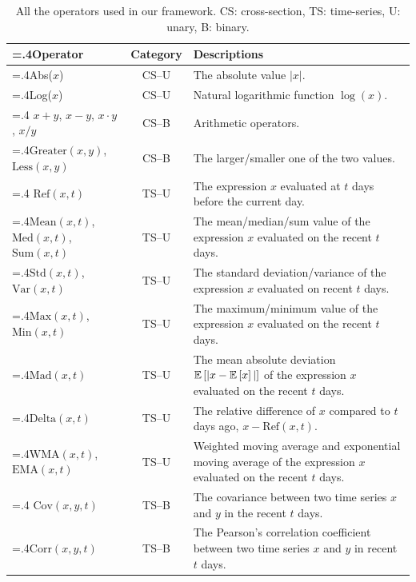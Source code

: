\begin{table}[]
	\centering
	\caption{All the operators used in our framework. CS: cross-section, TS: time-series, U: unary, B: binary.}
    \begin{tabularx}{\textwidth}{>{\hsize=.4\hsize}XcX}
        \toprule[1.5pt]
        Operator & Category & Descriptions \\
        \midrule
        Abs($x$) & CS--U & The absolute value $|x|$. \\
        Log($x$) & CS--U & Natural logarithmic function $\log(x)$. \\
        \hline
        $x+y$, $x-y$, $x \cdot y$, $x/y$ & CS--B & Arithmetic operators. \\
        $\mathrm{Greater}(x, y)$, $\mathrm{Less}(x, y)$ & CS--B & The larger/smaller one of the two values. \\
        \hline
        $\mathrm{Ref}(x, t)$ & TS--U & The expression $x$ evaluated at $t$ days before the current day. \\
        $\mathrm{Mean}(x, t)$, $\mathrm{Med}(x, t)$, $\mathrm{Sum}(x, t)$ & TS--U & The mean/median/sum value of the expression $x$ evaluated on the recent $t$ days. \\
        $\mathrm{Std}(x, t)$, $\mathrm{Var}(x, t)$ & TS--U & The standard deviation/variance of the expression $x$ evaluated on recent $t$ days. \\
        $\mathrm{Max}(x, t)$, $\mathrm{Min}(x, t)$ & TS--U & The maximum/minimum value of the expression $x$ evaluated on the recent $t$ days. \\
        $\mathrm{Mad}(x, t)$ & TS--U & The mean absolute deviation $\mathbb{E}\left[|x - \mathbb{E}\left[x\right]|\right]$ of the expression $x$ evaluated on the recent $t$ days. \\
        $\mathrm{Delta}(x, t)$ & TS--U & The relative difference of $x$ compared to $t$ days ago, $x - \mathrm{Ref}(x, t)$. \\
        $\mathrm{WMA}(x, t)$, $\mathrm{EMA}(x, t)$ & TS--U & Weighted moving average and exponential moving average of the expression $x$ evaluated on the recent $t$ days. \\
        \hline
        $\mathrm{Cov}(x, y, t)$ & TS--B & The covariance between two time series $x$ and $y$ in the recent $t$ days. \\
        $\mathrm{Corr}(x, y, t)$ & TS--B & The Pearson's correlation coefficient between two time series $x$ and $y$ in recent $t$ days. \\
        \bottomrule[1.5pt]
    \end{tabularx}
	\label{tab:operators}
\end{table}

